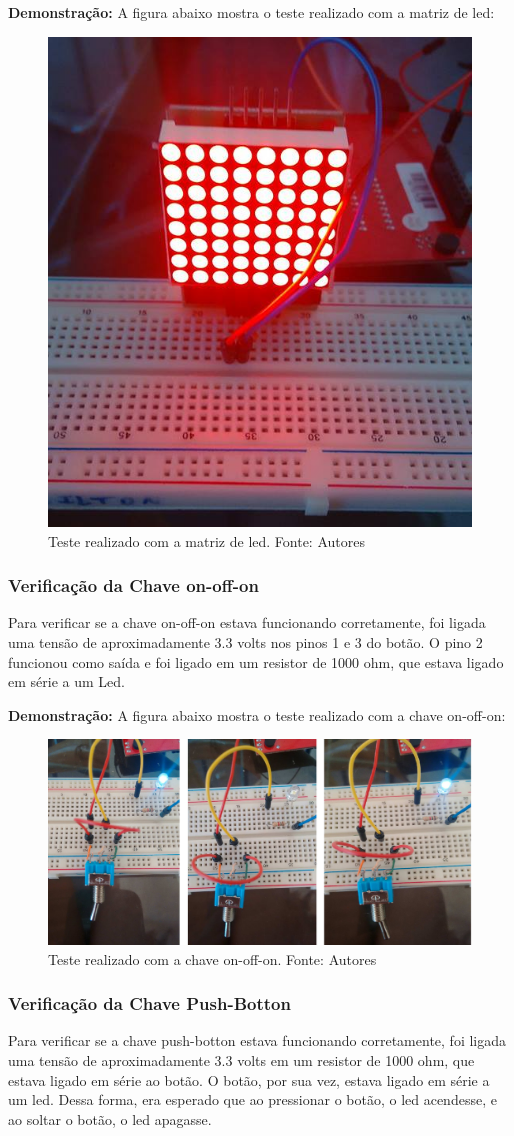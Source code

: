 \documentclass[conference]{IEEEtran}
\begin{document}
\textbf{Demonstração:}
A figura abaixo mostra o teste realizado com a matriz de led:
\begin{figure}[H]
  \centering
  \includegraphics[width=0.5\linewidth]{dem_matriz}
  \caption{Teste realizado com a matriz de led. Fonte: Autores}
  \label{fig:dem_matriz}
\end{figure}

\subsubsection{Verificação da Chave on-off-on}
Para verificar se a chave on-off-on estava funcionando corretamente, foi ligada uma tensão de aproximadamente 3.3 volts nos pinos 1 e 3 do botão. O pino 2 funcionou como saída e foi ligado em um resistor de 1000 ohm, que estava ligado em série a um Led.

\textbf{Demonstração:}
A figura abaixo mostra o teste realizado com a chave on-off-on:
\begin{figure}[H]
  \centering
  \includegraphics[width=0.5\linewidth]{on-off}
  \caption{Teste realizado com a chave on-off-on. Fonte: Autores}
  \label{fig:dem_on_off}
\end{figure}

\subsubsection{Verificação da Chave Push-Botton}
Para verificar se a chave push-botton estava funcionando corretamente, foi ligada uma tensão de aproximadamente 3.3 volts em um resistor de 1000 ohm, que estava ligado em série ao botão. O botão, por sua vez, estava ligado em série a um led. Dessa forma, era esperado que ao pressionar o botão, o led acendesse, e ao soltar o botão, o led apagasse.
\end{document}
